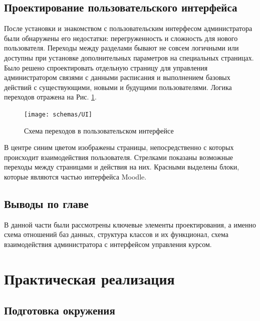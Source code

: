 \documentclass[a4paper,14pt]{article}
\begin{document}
\subsection{Проектирование пользовательского интерфейса}

После установки и знакомством с пользовательским интерфесом администратора были обнаружены его недостатки: перегруженность и сложность для нового пользователя.
Переходы между разделами бывают не совсем логичными или доступны при установке дополнительных параметров на специальных страницах.
Было решено спроектировать отдельную страницу для управления администратором связями с данными расписания и выполнением базовых действий с существующими, новыми и будущими пользователями.
Логика переходов отражена на Рис. \ref{img:UI}.

\begin{figure}[H]
	\centering		
	\texttt{[image: schemas/UI]}
	\caption{Схема переходов в пользовательском интерфейсе}\label{img:UI}
\end{figure}

В центре синим цветом изображены страницы, непосредственно с которых происходит взаимодействия пользователя.
Стрелками показаны возможные переходы между страницами и действия на них.
Красными выделены блоки, которые являются частью интерфейса Moodle.






\subsection{Выводы по главе}

В данной части были рассмотрены ключевые элементы проектирования, а именно схема отношений баз данных, структура классов и их функционал, схема взаимодействия администратора с интерфейсом управления курсом.


\section{Практическая реализация}
\subsection{Подготовка окружения}
\end{document}

